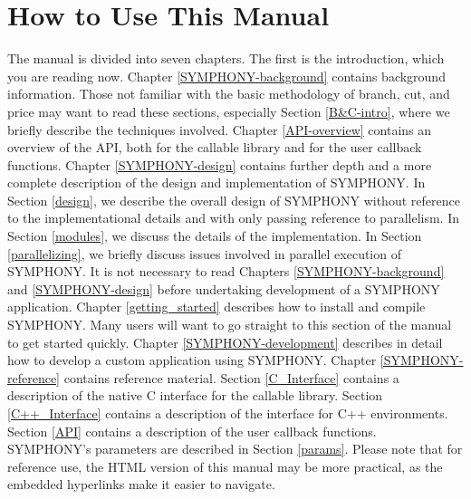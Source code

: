 \section{How to Use This Manual}

The manual is divided into seven chapters. The first is the introduction,
which you are reading now. Chapter \ref{SYMPHONY-background} contains
background information. Those not familiar with the basic methodology of
branch, cut, and price may want to read these sections, especially Section
\ref{B&C-intro}, where we briefly describe the techniques involved. Chapter
\ref{API-overview} contains an overview of the API, both for the callable
library and for the user callback functions. Chapter \ref{SYMPHONY-design}
contains further depth and a more complete description of the design and
implementation of SYMPHONY. In Section \ref{design}, we describe the overall
design of SYMPHONY without reference to the implementational details and with
only passing reference to parallelism. In Section \ref{modules}, we discuss
the details of the implementation. In Section \ref{parallelizing}, we briefly
discuss issues involved in parallel execution of SYMPHONY. It is not necessary
to read Chapters \ref{SYMPHONY-background} and \ref{SYMPHONY-design} before
undertaking development of a SYMPHONY application. Chapter
\ref{getting_started} describes how to install and compile SYMPHONY. Many
users will want to go straight to this section of the manual to get started
quickly. Chapter \ref{SYMPHONY-development} describes in detail how to develop
a custom application using SYMPHONY. Chapter
\ref{SYMPHONY-reference} contains reference material. Section
\ref{C_Interface} contains a description of the native C interface for the
callable library. Section \ref{C++_Interface} contains a description of the
interface for C++ environments. Section \ref{API} contains a description of
the user callback functions. SYMPHONY's parameters are described in Section
\ref{params}. Please note that for reference use, the HTML version of this
manual may be more practical, as the embedded hyperlinks make it easier to
navigate.

